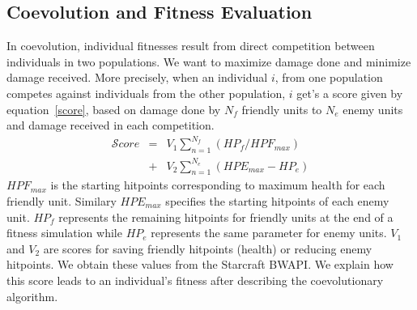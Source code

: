\documentclass[conference,10pt]{IEEEtran}
\begin{document}
\subsection{Coevolution and Fitness Evaluation}
\label{SubsectionFitness Evaluation}
%
In coevolution, individual fitnesses result from direct competition
between individuals in two populations. We want to maximize damage
done and minimize damage received. More precisely, when an individual
$i$, from one population competes against individuals from the other
population, $i$ get’s a score given by equation~\ref{score}, based on damage
done by $N_f$ friendly units to $N_e$ enemy units and damage received in each competition.
%
\begin{equation}
  \label{score}
  \begin{array}{lcl}
    \mathcal Score & = & V_1 \sum\limits_{n=1}^{N_f} (HP_f/HPF_{max})\\
                   & + & V_2 \sum\limits_{n=1}^{N_e} (HPE_{max} - HP_e)
    \end{array}
\end{equation}
%
$HPF_{max}$ is the starting hitpoints corresponding to maximum health
for each friendly unit. Similary $HPE_{max}$ specifies the starting
hitpoints of each enemy unit. $HP_f$ represents the remaining
hitpoints for friendly units at the end of a fitness simulation while
$HP_e$ represents the same parameter for enemy units. $V_1$ and $V_2$
are scores for saving friendly hitpoints (health) or reducing enemy
hitpoints.  We obtain these values from the Starcraft BWAPI. We
explain how this score leads to an individual's fitness after
describing the coevolutionary algorithm.
%
\end{document}

